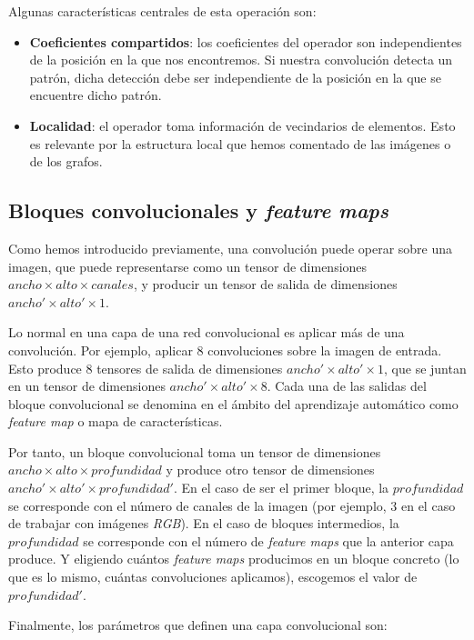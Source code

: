 Algunas características centrales de esta operación son:

\begin{itemize}
    \item \textbf{Coeficientes compartidos}: los coeficientes del operador son independientes de la posición en la que nos encontremos. Si nuestra convolución detecta un patrón, dicha detección debe ser independiente de la posición en la que se encuentre dicho patrón.
    \item \textbf{Localidad}: el operador toma información de vecindarios de elementos. Esto es relevante por la estructura local que hemos comentado de las imágenes o de los grafos.
\end{itemize}

\subsection{Bloques convolucionales y \textit{feature maps}}

Como hemos introducido previamente, una convolución puede operar sobre una imagen, que puede representarse como un tensor de dimensiones $ancho \times alto \times canales$, y producir un tensor de salida de dimensiones $ancho'  \times alto' \times 1$.

Lo normal en una capa de una red convolucional es aplicar más de una convolución. Por ejemplo, aplicar 8 convoluciones sobre la imagen de entrada. Esto produce 8 tensores de salida de dimensiones $ancho' \times alto' \times 1$, que se juntan en un tensor de dimensiones $ancho' \times alto' \times 8$. Cada una de las salidas del bloque convolucional se denomina en el ámbito del aprendizaje automático como \textit{feature map} o mapa de características.

Por tanto, un bloque convolucional toma un tensor de dimensiones $ancho \times alto \times profundidad$ y produce otro tensor de dimensiones $ancho' \times alto' \times profundidad'$. En el caso de ser el primer bloque, la $profundidad$ se corresponde con el número de canales de la imagen (por ejemplo, 3 en el caso de trabajar con imágenes \textit{RGB}). En el caso de bloques intermedios, la $profundidad$ se corresponde con el número de \textit{feature maps} que la anterior capa produce. Y eligiendo cuántos \textit{feature maps} producimos en un bloque concreto (lo que es lo mismo, cuántas convoluciones aplicamos), escogemos el valor de $profundidad'$.

Finalmente, los parámetros que definen una capa convolucional son:

